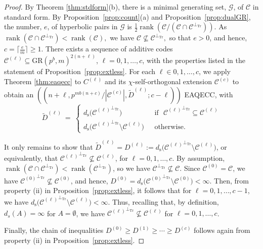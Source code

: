 \documentclass{article}
\DeclareMathOperator{\Tr}{Tr}
\DeclareMathOperator{\rank}{rank}
\theoremstyle{remark}
\theoremstyle{definition}
\numberwithin{equation}{section}
\begin{document}
\begin{proof} By Theorem \ref{thm:stdform}(b), there is a minimal generating set, $\mathcal{G}$, of $\mathcal{C}$ in standard form. By Proposition~\ref{prop:count}(a) and Proposition~\ref{prop:dualGR}, the number, $e$, of hyperbolic pairs in $\mathcal{G}$ is $\frac12 \rank(\mathcal{C}/(\mathcal{C} \cap \mathcal{C}^{\perp_{\Tr}}))$.   As $\rank(\mathcal{C}  \cap  \mathcal{C}^{\perp_{\Tr}}) < \rank(\mathcal{C}),$ we have $\mathcal{C}   \not\subseteq \mathcal{C}^{\perp_{\Tr}},$ so that $e > 0$, and hence, $c = \lceil \frac{e}{m} \rceil \ge 1$. There exists a sequence of additive codes $\mathcal{C}^{(\ell)} \subseteq \text{GR}(p^b,m)^{2(n+\ell)}$, $\ell = 0,1,\ldots,c$, with the properties listed in the statement of Proposition~\ref{prop:extless}. For each $\ell \in 0,1,\ldots,c$, we apply Theorem \ref{thm:eaqecc} to $C^{(\ell)}$ and its $\chi$-self-orthogonal extension $\mathcal{C}^{(c)}$ to obtain an $((n+{\ell},p^{mb(n+c)}/{|\mathcal{C}^{(c)}|},\widetilde{D}^{(\ell)};c-\ell))$ EAQECC, with  \begin{equation*}
\widetilde{D}^{(\ell)}\ = \ \left\{\begin{array}{ll}
d_{\mathrm{s}}\bigl({\mathcal{C}^{(\ell)}}^{\perp_{\Tr}}\bigr) & \text{~~if~~} {\mathcal{C}^{(\ell)}}^{\perp_{\Tr}} \subseteq \mathcal{C}^{(\ell)} \\
d_{\mathrm{s}}\bigl({\mathcal{C}^{(\ell)}}^{\perp_{\Tr}} \setminus \mathcal{C}^{(\ell)}\bigr)  & \text{~~otherwise}.\,
\end{array}\right.
\end{equation*}

It only remains to show that $\widetilde{D}^{(\ell)} = D^{(\ell)} := d_{\mathrm{s}}\bigl({\mathcal{C}^{(\ell)}}^{\perp_{\Tr}} \setminus \mathcal{C}^{(\ell)}\bigr)$, or equivalently, that ${\mathcal{C}^{(\ell)}}^{\perp_{\Tr}} \not \subseteq \mathcal{C}^{(\ell)}$, for $\ell = 0,1,\ldots,c$.
By assumption, $\rank(\mathcal{C}  \cap  \mathcal{C}^{\perp_{\Tr}}) <  \rank(\mathcal{C}^{\perp_{\Tr}})$, so we have $\mathcal{C}^{\perp_{\Tr}} \not\subseteq \mathcal{C}$. Since $\mathcal{C}^{(0)} = \mathcal{C}$, we have ${\mathcal{C}^{(0)}}^{\perp_{\Tr}} \not \subseteq \mathcal{C}^{(0)}$, and hence, $D^{(0)} = d_{\mathrm{s}}\bigl({\mathcal{C}^{(0)}}^{\perp_{\Tr}} \setminus \mathcal{C}^{(0)}\bigr) < \infty$. Then, from property (ii) in Proposition~\ref{prop:extless}, it follows that for $\ell = 0,1,\ldots,c-1$, we have $d_{\mathrm{s}}\bigl({\mathcal{C}^{(\ell)}}^{\perp_{\Tr}} \setminus \mathcal{C}^{(\ell)}\bigr) < \infty$. Thus, recalling that, by definition, $d_s(A) = \infty$ for $A = \emptyset$, we have ${\mathcal{C}^{(\ell)}}^{\perp_{\Tr}} \not \subseteq \mathcal{C}^{(\ell)}$ for $\ell = 0,1,\ldots,c$. 

Finally, the chain of inequalities $D^{(0)} \ge D^{(1)} \ge \cdots \ge D^{(c)}$ follows again from property (ii) in Proposition~\ref{prop:extless}. 
\end{proof}
\end{document}
